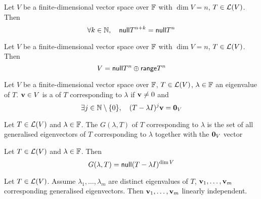 \documentclass[aspectratio=169]{beamer}
\begin{document}
\begin{frame}
\begin{theorem}
Let $V$ be a finite-dimensional vector space over $\mathbb{F}$ with $\dim V=n$, $T\in\mathcal{L}(V)$. Then 
\[
\forall k\in\mathbb{N},\quad \mathsf{null} T^{n+k}=\mathsf{null} T^n
\]
\end{theorem}
\vfill
\begin{importanttheorem}[$V=\nullspace T^{\dim V}\oplus\range T^{\dim V}$]
Let $V$ be a finite-dimensional vector space over $\mathbb{F}$ with $\dim V=n$, $T\in\mathcal{L}(V)$. Then
\[
V=\mathsf{null} T^n\oplus \mathsf{range} T^n
\]
\end{importanttheorem}
\end{frame}


\begin{frame}
\begin{definition}
Let $V$ be a finite-dimensional vector space over $\mathbb{F}$, $T\in\mathcal{L}(V)$, $\lambda\in\mathbb{F}$ an eigenvalue of $T$. $\mathbf{v}\in V$ is a  of $T$ corresponding to $\lambda$ if $\mathbf{v}\neq 0$ and
\[
\exists j\in\IN\setminus\{0\},\quad
(T-\lambda I)^j\bv=\b0_V
\]
\end{definition}

\begin{definition}
Let $T\in\mathcal{L}(V)$ and $\lambda\in\mathbb{F}$. The  $G(\lambda,T)$ of $T$ corresponding to $\lambda$ is the set of all generalised eigenvectors of $T$ corresponding to $\lambda$ together with the $\b0_V$ vector
\end{definition}
\end{frame}


\begin{frame}
\begin{importanttheorem}
Let $T\in\mathcal{L}(V)$ and $\lambda\in\mathbb{F}$. Then
\[
G(\lambda,T)=\mathsf{null}(T-\lambda I)^{\dim V}
\]
\end{importanttheorem}
\vfill
\begin{theorem}
Let $T\in\mathcal{L}(V)$. Assume $\lambda_1,\ldots,\lambda_m$ are distinct eigenvalues of $T$, $\mathbf{v}_1,\ldots,\mathbf{v}_m$ corresponding generalised eigenvectors. Then $\mathbf{v}_1,\ldots,\mathbf{v}_m$ linearly independent.
\end{theorem}
\end{frame}
\end{document}

